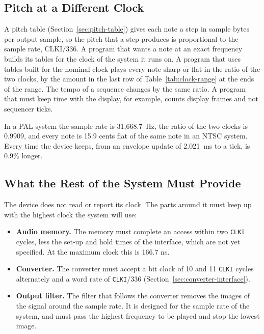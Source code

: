 \subsection{Pitch at a Different Clock}

A pitch table (Section~\ref{sec:pitch-table}) gives each note a step in sample bytes per output sample, so the pitch
that a step produces is proportional to the sample rate, $\mathrm{CLKI} / 336$. A program that wants a note at an exact
frequency builds its tables for the clock of the system it runs on. A program that uses tables built for the nominal
clock plays every note sharp or flat in the ratio of the two clocks, by the amount in the last row of
Table~\ref{tab:clock-range} at the ends of the range. The tempo of a sequence changes by the same ratio. A program that
must keep time with the display, for example, counts display frames and not sequencer ticks.

In a PAL system the sample rate is 31,668.7~Hz, the ratio of the two clocks is 0.9909, and every note is 15.9 cents
flat of the same note in an NTSC system. Every time the device keeps, from an envelope update of 2.021~ms to a tick, is
0.9\% longer.

\subsection{What the Rest of the System Must Provide}

The device does not read or report its clock. The parts around it must keep up with the highest clock the system will
use:

\begin{itemize}
	\item \textbf{Audio memory.} The memory must complete an access within two \texttt{CLKI} cycles, less the set-up and
	      hold times of the interface, which are not yet specified. At the maximum clock this is 166.7 ns.
	\item \textbf{Converter.} The converter must accept a bit clock of 10 and 11 \texttt{CLKI} cycles alternately and a word rate of
	      \texttt{CLKI}/336 (Section~\ref{sec:converter-interface}).
	\item \textbf{Output filter.} The filter that follows the converter removes the images of the signal around the
	      sample rate. It is designed for the sample rate of the system, and must pass the highest frequency to be played
	      and stop the lowest image.
\end{itemize}

